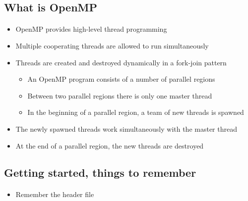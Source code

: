\documentclass[%
oneside,                 %
final,                   %
10pt]{article}
\begin{document}
\subsection*{What is OpenMP}

\paragraph{}
\begin{itemize}
\item OpenMP provides high-level thread programming

\item Multiple cooperating threads are allowed to run simultaneously

\item Threads are created and destroyed dynamically in a fork-join pattern
\begin{itemize}

   \item An OpenMP program consists of a number of parallel regions

   \item Between two parallel regions there is only one master thread

   \item In the beginning of a parallel region, a team of new threads is spawned

\end{itemize}

\noindent
  \item The newly spawned threads work simultaneously with the master thread

  \item At the end of a parallel region, the new threads are destroyed
\end{itemize}

\noindent



\subsection*{Getting started, things to remember}

\paragraph{}
\begin{itemize}
 \item Remember the header file 
\end{itemize}
\end{document}
